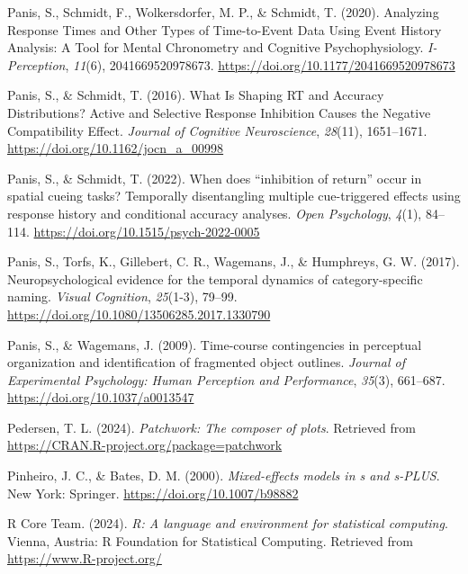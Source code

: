 \documentclass[
  man, donotrepeattitle,floatsintext]{apa6}
\newlength{\cslhangindent}
\newenvironment{CSLReferences}[2] %
 {\begin{list}{}{%
  \setlength{\itemindent}{0pt}
  \setlength{\leftmargin}{0pt}
  \setlength{\parsep}{0pt}
  \ifodd #1
   \setlength{\leftmargin}{\cslhangindent}
   \setlength{\itemindent}{-1\cslhangindent}
  \fi
  \setlength{\itemsep}{#2\baselineskip}}}
 {\end{list}}
\begin{document}
\begin{CSLReferences}{1}{0}
Panis, S., Schmidt, F., Wolkersdorfer, M. P., \& Schmidt, T. (2020). Analyzing {Response Times} and {Other Types} of {Time-to-Event Data Using Event History Analysis}: {A Tool} for {Mental Chronometry} and {Cognitive Psychophysiology}. \emph{I-Perception}, \emph{11}(6), 2041669520978673. \url{https://doi.org/10.1177/2041669520978673}

Panis, S., \& Schmidt, T. (2016). What {Is Shaping RT} and {Accuracy Distributions}? {Active} and {Selective Response Inhibition Causes} the {Negative Compatibility Effect}. \emph{Journal of Cognitive Neuroscience}, \emph{28}(11), 1651--1671. \url{https://doi.org/10.1162/jocn_a_00998}

Panis, S., \& Schmidt, T. (2022). When does {``inhibition of return''} occur in spatial cueing tasks? {Temporally} disentangling multiple cue-triggered effects using response history and conditional accuracy analyses. \emph{Open Psychology}, \emph{4}(1), 84--114. \url{https://doi.org/10.1515/psych-2022-0005}

Panis, S., Torfs, K., Gillebert, C. R., Wagemans, J., \& Humphreys, G. W. (2017). Neuropsychological evidence for the temporal dynamics of category-specific naming. \emph{Visual Cognition}, \emph{25}(1-3), 79--99. \url{https://doi.org/10.1080/13506285.2017.1330790}

Panis, S., \& Wagemans, J. (2009). Time-course contingencies in perceptual organization and identification of fragmented object outlines. \emph{Journal of Experimental Psychology: Human Perception and Performance}, \emph{35}(3), 661--687. \url{https://doi.org/10.1037/a0013547}

Pedersen, T. L. (2024). \emph{Patchwork: The composer of plots}. Retrieved from \url{https://CRAN.R-project.org/package=patchwork}

Pinheiro, J. C., \& Bates, D. M. (2000). \emph{Mixed-effects models in s and s-PLUS}. New York: Springer. \url{https://doi.org/10.1007/b98882}

R Core Team. (2024). \emph{R: A language and environment for statistical computing}. Vienna, Austria: R Foundation for Statistical Computing. Retrieved from \url{https://www.R-project.org/}


\end{CSLReferences}
\end{document}
